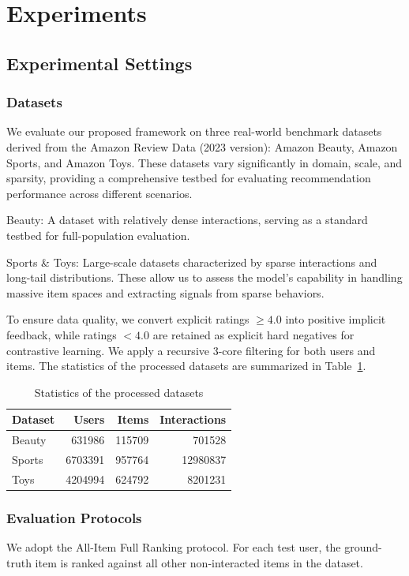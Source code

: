 \section{Experiments}
\label{sec:experiments}

\subsection{Experimental Settings}
\label{subsec:experimental_settings}

\subsubsection{Datasets}
We evaluate our proposed framework on three real-world benchmark datasets derived from the Amazon Review Data (2023 version): Amazon Beauty, Amazon Sports, and Amazon Toys. These datasets vary significantly in domain, scale, and sparsity, providing a comprehensive testbed for evaluating recommendation performance across different scenarios.

Beauty: A dataset with relatively dense interactions, serving as a standard testbed for full-population evaluation.

Sports \& Toys: Large-scale datasets characterized by sparse interactions and long-tail distributions. These allow us to assess the model's capability in handling massive item spaces and extracting signals from sparse behaviors.

To ensure data quality, we convert explicit ratings $\geq 4.0$ into positive implicit feedback, while ratings $< 4.0$ are retained as explicit hard negatives for contrastive learning. We apply a recursive 3-core filtering for both users and items. The statistics of the processed datasets are summarized in Table~\ref{tab:dataset_stats}.

\begin{table}[htbp]
\centering
\caption{Statistics of the processed datasets}
\label{tab:dataset_stats}
\begin{tabular}{lrrr}
\toprule
Dataset & Users & Items & Interactions \\
\midrule
Beauty & 631986 & 115709 & 701528 \\
Sports & 6703391 & 957764 & 12980837 \\
Toys & 4204994 & 624792 & 8201231 \\
\bottomrule
\end{tabular}
\end{table}

\subsubsection{Evaluation Protocols}
We adopt the All-Item Full Ranking protocol. For each test user, the ground-truth item is ranked against all other non-interacted items in the dataset.

